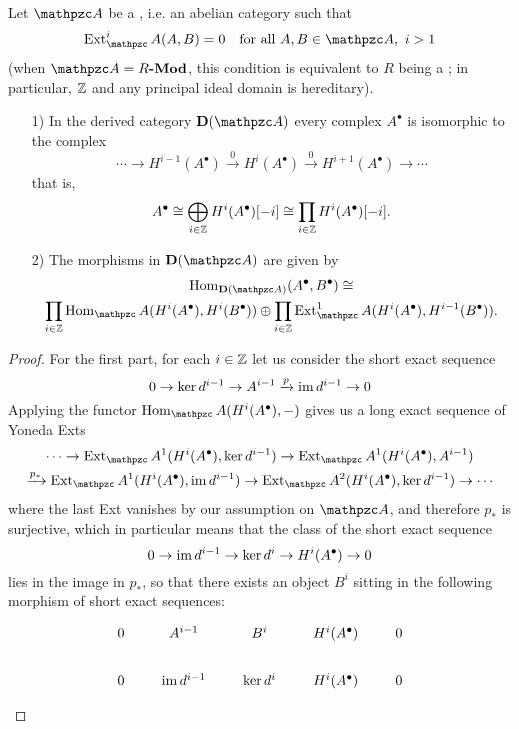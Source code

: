 \begin{lemma}
  \label{lemma:morphisms-in-DAb}
  Let $\vcateg{A}$ be a , i.e. an abelian
  category such that
  $$\Ext^i_\vcateg{A} (A,B) = 0\quad\text{for all }A,B\in \vcateg{A}, ~ i>1$$
  (when $\vcateg{A} = R\categ{-Mod}$, this condition is equivalent to $R$ being
  a ; in particular, $\mathbb{Z}$ and any principal ideal domain
  is hereditary).

  \begin{enumerate}
  \item[1)] In the derived category $\categ{D} (\vcateg{A})$ every complex
    $A^\bullet$ is isomorphic to the complex
    \[ \cdots \to H^{i-1} (A^\bullet) \xrightarrow{0}
      H^i (A^\bullet) \xrightarrow{0}
      H^{i+1} (A^\bullet) \to \cdots \]
    that is,
    \[ A^\bullet \cong
      \bigoplus_{i\in \mathbb{Z}} H^i (A^\bullet) [-i] \cong
      \prod_{i\in \mathbb{Z}} H^i (A^\bullet) [-i]. \]

  \item[2)] The morphisms in $\categ{D} (\vcateg{A})$ are given by
    \begin{multline*}
      \Hom_{\categ{D} (\vcateg{A})} (A^\bullet, B^\bullet) \isom \\
      \prod_{i\in \ZZ} \Hom_\vcateg{A} (H^i (A^\bullet), H^i (B^\bullet))
      \oplus
      \prod_{i\in \ZZ} \Ext^1_\vcateg{A} (H^i (A^\bullet), H^{i-1} (B^\bullet)).
    \end{multline*}
  \end{enumerate}

  \begin{proof}
    For the first part, for each $i\in\mathbb{Z}$ let us consider the short exact
    sequence
    $$0 \to \ker d^{i-1} \to A^{i-1} \xrightarrow{p} \operatorname{im} d^{i-1} \to 0$$
    Applying the functor $\Hom_\vcateg{A} (H^i (A^\bullet), -)$ gives us a long
    exact sequence of Yoneda Exts
    \begin{multline*}
      \cdots \to \Ext_\vcateg{A}^1 (H^i (A^\bullet), \ker d^{i-1}) \to
      \Ext_\vcateg{A}^1 (H^i (A^\bullet), A^{i-1}) \\
      \xrightarrow{p_*} \Ext_\vcateg{A}^1 (H^i (A^\bullet), \im d^{i-1}) \to
      \Ext_\vcateg{A}^2 (H^i (A^\bullet), \ker d^{i-1}) \to \cdots
    \end{multline*}
    where the last Ext vanishes by our assumption on $\vcateg{A}$, and therefore
    $p_*$ is surjective, which in particular means that the class of the short
    exact sequence
    $$0 \to \operatorname{im} d^{i-1} \to \ker d^i \to H^i (A^\bullet) \to 0$$
    lies in the image in $p_*$, so that there exists an object $B^i$ sitting in
    the following morphism of short exact sequences:
    \[ \begin{tikzpicture}
        \matrix(m)[matrix of math nodes, row sep=2em, column sep=2em, text height=1.5ex, text depth=0.25ex]{
          0 & A^{i-1} & B^i & H^i (A^\bullet) & 0 \\
          0 & \im d^{i-1} & \ker d^i & H^i (A^\bullet) & 0 \\};


\end{tikzpicture}\]
\end{proof}
\end{lemma}
